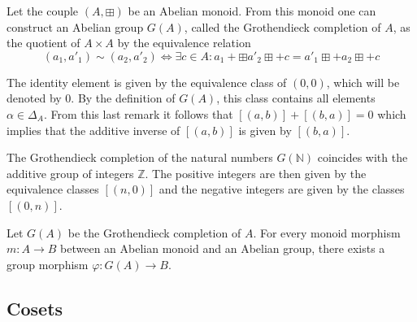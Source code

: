         \begin{construct}\label{group:grothendieck_completion}
		Let the couple $(A, \boxplus )$ be an Abelian monoid. From this monoid one can construct an Abelian group $G(A)$, called the Grothendieck completion of $A$, as the quotient of $A\times A$ by the equivalence relation
		\begin{equation}
			(a_1, a'_1)\sim (a_2, a'_2) \iff \exists c\in A: a_1 +\boxplus  a'_2 \boxplus + c = a'_1 \boxplus + a_2 \boxplus + c
		\end{equation}
		
		The identity element is given by the equivalence class of $(0, 0)$, which will be denoted by 0. By the definition of $G(A)$, this class contains all elements $\alpha\in\Delta_A$. From this last remark it follows that $[(a, b)] + [(b, a)] = 0$ which implies that the additive inverse of $[(a, b)]$ is given by $[(b, a)]$.
        \end{construct}
        
        \begin{example}
        	The Grothendieck completion of the natural numbers $G(\mathbb{N})$ coincides with the additive group of integers $\mathbb{Z}$. The positive integers are then given by the equivalence classes $[(n, 0)]$ and the negative integers are given by the classes $[(0, n)]$.
        \end{example}
        
        \begin{uproperty}
        	Let $G(A)$ be the Grothendieck completion of $A$. For every monoid morphism $m:A\rightarrow B$ between an Abelian monoid and an Abelian group, there exists a group morphism $\varphi:G(A)\rightarrow B$.
        \end{uproperty}

\subsection{Cosets}

        
